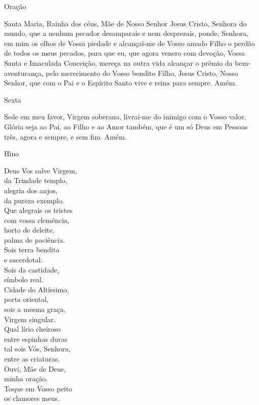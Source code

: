 \begin{center}
    \textcolor{VioletRed3}{Oração}
\end{center}
\begin{flushleft}
    Santa Maria, Rainha dos céus, Mãe de Nosso Senhor Jesus Cristo, Senhora do mundo, que a nenhum pecador desamparais e nem desprezais, ponde, Senhora, em mim os olhos de Vossa piedade e alcançai-me de Vosso amado Filho o perdão de todos os meus pecados, para que eu, que agora venero com devoção, Vossa Santa e Imaculada Conceição, mereça na outra vida alcançar o prêmio da bem-aventurança, pelo merecimento do Vosso bendito Filho, Jesus Cristo, Nosso Senhor, que com o Pai e o Espírito Santo vive e reina para sempre. Amém.
\end{flushleft}
\newpage
\begin{center}
    Sexta
\end{center}
\begin{flushleft}
    Sede em meu favor, Virgem soberana, livrai-me do inimigo com o Vosso valor. Glória seja ao Pai, ao Filho e ao Amor também, que é um só Deus em Pessoas três, agora e sempre, e sem fim. Amém.
\end{flushleft}
\begin{center}
    \textcolor{VioletRed3}{Hino}
\end{center}
\begin{multicols}{2}\setlength{\parindent}{0pt}
    Deus Vos salve Virgem, \\
    da Trindade templo, \\
    alegria dos anjos, \\
    da pureza exemplo.
    \vspace{.2cm} \\
    Que alegrais os tristes \\
    com vossa clemência, \\
    horto de deleite, \\
    palma de paciência.
    \vspace{.2cm} \\
    Sois terra bendita \\
    e sacerdotal. \\
    Sois da castidade, \\
    símbolo real.
    \vspace{.2cm} \\
    Cidade do Altíssimo, \\
    porta oriental, \\
    sois a mesma graça, \\
    Virgem singular.
    \vspace{.2cm} \\
    Qual lírio cheiroso \\
    entre espinhas duras \\
    tal sois Vós, Senhora, \\
    entre as criaturas.
    \vspace{.2cm} \\
    Ouvi, Mãe de Deus, \\
    minha oração. \\
    Toque em Vosso peito \\
    os clamores meus.
\end{multicols}
